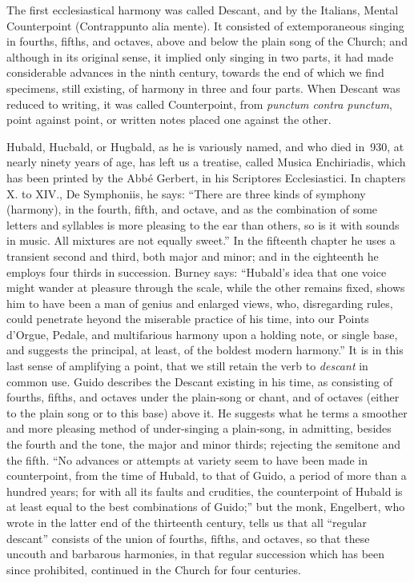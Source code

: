 The first ecclesiastical harmony was called Descant, and by the Italians, Mental
Counterpoint (Contrappunto alia mente). It consisted of extemporaneous singing
in fourths, fifths, and octaves, above and below the plain song of the Church; and
although in its original sense, it implied only singing in two parts, it had made
considerable advances in the ninth century, towards the end of which we find
specimens, still existing, of harmony in three and four parts. When Descant was
reduced to writing, it was called Counterpoint, from \textit{punctum contra punctum},
point against point, or written notes placed one against the other.

Hubald, Hucbald, or Hugbald, as he is variously named, and who died in~930,
at nearly ninety years of age, has left us a treatise, called Musica Enchiriadis,
which has been printed by the Abbé Gerbert, in his Scriptores Ecclesiastici. In
chapters X. to XIV., De Symphoniis, he says: “There are three kinds of
symphony (harmony), in the fourth, fifth, and octave, and as the combination of
some letters and syllables is more pleasing to the ear than others, so is it with
sounds in music. All mixtures are not equally sweet.” In the fifteenth chapter
he uses a transient second and third, both major and minor; and in the eighteenth
he employs four thirds in succession. Burney says: “Hubald’s idea that one
voice might wander at pleasure through the scale, while the other remains fixed,
shows him to have been a man of genius and enlarged views, who, disregarding
rules, could penetrate heyond the miserable practice of his time, into our Points
d’Orgue, Pedale, and multifarious harmony upon a holding note, or single base,
and suggests the principal, at least, of the boldest modern harmony.” It is in
this last sense of amplifying a point, that we still retain the verb to \textit{descant} in
common use. Guido describes the Descant
\pagebreak
existing in his time, as consisting of 
fourths, fifths, and octaves under the plain-song or chant, and of octaves (either 
to the plain song or to this base) above it. He suggests what he terms a smoother
and more pleasing method of under-singing a plain-song, in admitting, besides the
fourth and the tone, the major and minor thirds; rejecting the semitone and the
fifth. “No advances or attempts at variety seem to have been made in counterpoint,
from the time of Hubald, to that of Guido, a period of more than a hundred
years; for with all its faults and crudities, the counterpoint of Hubald is at least
equal to the best combinations of Guido;” but the monk, Engelbert, who wrote in
the latter end of the thirteenth century, tells us that all “regular descant” consists
of the union of fourths, fifths, and octaves, so that these uncouth and barbarous
harmonies, in that regular succession which has been since prohibited,
continued in the Church for four centuries.

